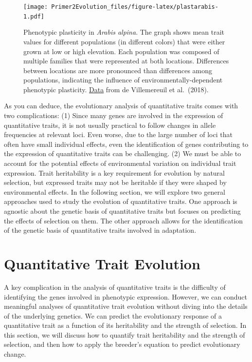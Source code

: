 \documentclass[
]{book}
\begin{document}
\begin{figure}
\centering
\texttt{[image: Primer2Evolution\_files/figure-latex/plastarabis-1.pdf]}
\caption{\label{fig:plastarabis}Phenotypic plasticity in \emph{Arabis alpina}. The graph shows mean trait values for different populations (in different colors) that were either grown at low or high elevation. Each population was composed of multiple families that were represented at both locations. Differences between locations are more pronounced than differences among populations, indicating the influence of environmentally-dependent phenotypic plasticity. \href{data/8_plasticity.csv}{Data} from de Villemereuil et al.~(2018).}
\end{figure}

As you can deduce, the evolutionary analysis of quantitative traits comes with two complications: (1) Since many genes are involved in the expression of quantitative traits, it is not usually practical to follow changes in allele frequencies at relevant loci. Even worse, due to the large number of loci that often have small individual effects, even the identification of genes contributing to the expression of quantitative traits can be challenging. (2) We must be able to account for the potential effects of environmental variation on individual trait expression. Trait heritability is a key requirement for evolution by natural selection, but expressed traits may not be heritable if they were shaped by environmental effects. In the following section, we will explore two general approaches used to study the evolution of quantitative traits. One approach is agnostic about the genetic basis of quantitative traits but focuses on predicting the effects of selection on them. The other approach allows for the identification of the genetic basis of quantitative traits involved in adaptation.

\hypertarget{quantitative-trait-evolution}{%
\section{Quantitative Trait Evolution}\label{quantitative-trait-evolution}}

A key complication in the analysis of quantitative traits is the difficulty of identifying the genes involved in phenotypic expression. However, we can conduct meaningful analyses of quantitative trait evolution without diving into the details of the underlying genetics. We can predict the evolutionary response of a quantitative trait as a function of its heritability and the strength of selection. In this section, we will discuss how to quantify trait heritability and the strength of selection, and then how to apply the breeder's equation to predict evolutionary change.
\end{document}
